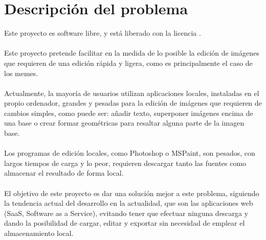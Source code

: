 \chapter{Descripción del problema}

Este proyecto es software libre, y está liberado con la licencia \cite{gplv3}.
\\\\
Este proyecto pretende facilitar en la medida de lo posible la edición de imágenes que requieren
de una edición rápida y ligera, como es principalmente el caso de los memes.
\\\\
Actualmente, la mayoría de usuarios utilizan aplicaciones locales, instaladas en el propio
ordenador, grandes y pesadas para la edición de imágenes que requieren de cambios simples, 
como puede ser: añadir texto, superponer imágenes encima de una base o crear formar geométricas
para resaltar alguna parte de la imagen base.
\\\\
Los programas de edición locales, como Photoshop o MSPaint, son pesados, con largos tiempos de
carga y lo peor, requieren descargar tanto las fuentes como almacenar el resultado de forma local.
\\\\
El objetivo de este proyecto es dar una solución mejor a este problema, siguiendo la tendencia
actual del desarrollo en la actualidad, que son las aplicaciones web (SaaS, Software as a Service), 
evitando tener que efectuar ninguna descarga y dando la posibilidad de cargar, editar y exportar sin 
necesidad de emplear el almacenamiento local.


